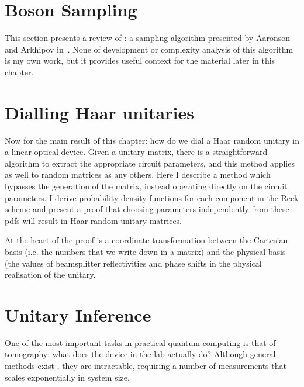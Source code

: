 \section{Boson Sampling}
\label{sec:BosenSampling}
This section presents a review of \bosonsampling{}: a sampling algorithm
presented by Aaronson and Arkhipov in~\cite{bosonsampling}. None of development
or complexity analysis of this algorithm is my own work, but it provides useful
context for the material later in this chapter.

\section{Dialling Haar unitaries}
\label{sec:Parameterization}
Now for the main result of this chapter: how do we dial a Haar random unitary in
a linear optical device. Given a unitary matrix, there is a straightforward
algorithm  to extract the appropriate circuit
parameters, and this method applies as well to random matrices as any others.
Here I describe a method which bypasses the generation of the matrix, instead
operating directly on the circuit parameters. I derive probability density
functions for each component in the Reck scheme and present a proof that
choosing parameters independently from these pdfs will result in Haar random
unitary matrices.

At the heart of the proof is a coordinate transformation between the Cartesian
basis (i.e. the numbers that we write down in a matrix) and the physical basis
(the values of beamsplitter reflectivities and phase shifts in the physical
realisation of the unitary.

\section{Unitary Inference}
\label{sec:UnitaryInference}
One of the most important tasks in practical quantum computing is that of
tomography: what does the device in the lab actually do? Although general
methods exist , they are intractable, requiring a number
of measurements that scales exponentially in system size.
